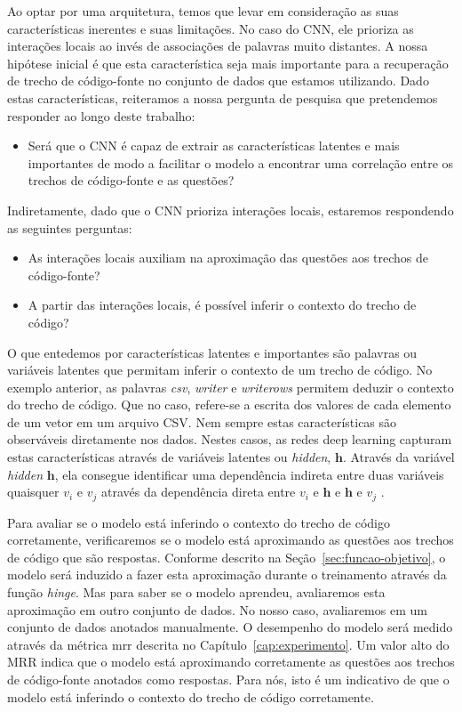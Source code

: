 Ao optar por uma arquitetura, temos que levar em consideração as suas características inerentes e suas limitações. No caso do CNN, ele prioriza as interações locais ao invés de associações de palavras muito distantes. A nossa hipótese inicial é que esta característica seja mais importante para a recuperação de trecho de código-fonte no conjunto de dados que estamos utilizando. Dado estas características, reiteramos a nossa pergunta de pesquisa que pretendemos responder ao longo deste trabalho:

\begin{itemize}
    \item Será que o CNN é capaz de extrair as características latentes e mais importantes de modo a facilitar o modelo a encontrar uma correlação entre os trechos de código-fonte e as questões?
\end{itemize}

Indiretamente, dado que o CNN prioriza interações locais, estaremos respondendo as seguintes perguntas:
\begin{itemize}
    
        \item As interações locais auxiliam na aproximação das questões aos trechos de código-fonte?
        \item A partir das interações locais, é possível inferir o contexto do trecho de código?
\end{itemize}



O que entedemos por características latentes e importantes são palavras ou variáveis latentes que permitam inferir o contexto de um trecho de código. No exemplo anterior, as palavras \emph{csv}, \emph{writer} e \emph{writerows} permitem deduzir o contexto do trecho de código. Que no caso, refere-se a escrita dos valores de cada elemento de um vetor em um arquivo CSV. Nem sempre estas características são observáveis diretamente nos dados. Nestes casos, as redes deep learning capturam estas características através de variáveis latentes ou \textit{hidden}, $\bm{h}$. Através da variável \textit{hidden} $\bm{h}$, ela consegue identificar uma dependência indireta entre duas variáveis quaisquer $v_{i}$ e $v_{j}$ através da dependência direta entre $v_{i}$ e $\bm{h}$ e $\bm{h}$ e $v_{j}$ \citep{Goodfellow-et-al-2016}.

Para avaliar se o modelo está inferindo o contexto do trecho de código corretamente, verificaremos se o modelo está aproximando as questões aos trechos de código que são respostas. Conforme descrito na Seção~\ref{sec:funcao-objetivo}, o modelo será induzido a fazer esta aproximação durante o treinamento através da função \textit{hinge}. Mas para saber se o modelo aprendeu, avaliaremos esta aproximação em outro conjunto de dados. No nosso caso, avaliaremos em um conjunto de dados anotados manualmente. O desempenho do modelo será medido através da métrica \acrshort{mrr} descrita no Capítulo~\ref{cap:experimento}. Um valor alto do MRR indica que o modelo está aproximando corretamente as questões aos trechos de código-fonte anotados como respostas. Para nós, isto é um indicativo de que o modelo está inferindo o contexto do trecho de código corretamente.
